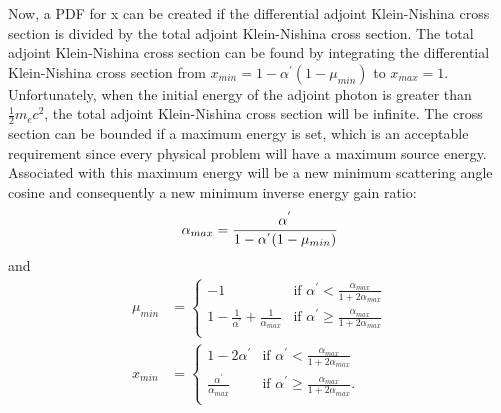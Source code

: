 Now, a PDF for x can be created if the differential adjoint Klein-Nishina cross
section is divided by the total adjoint Klein-Nishina cross section. The total
adjoint Klein-Nishina cross section can be found by integrating the differential
Klein-Nishina cross section from $x_{min} = 1-\alpha^{'}(1-\mu_{min})$ to 
$x_{max} = 1$. Unfortunately, when the initial energy of the adjoint photon is
greater than $\frac{1}{2}m_ec^2$, the total adjoint Klein-Nishina cross section
will be infinite. The cross section can be bounded if a maximum energy is set, 
which is an acceptable requirement since every physical problem will have a 
maximum source energy. Associated with this maximum energy will be a new 
minimum scattering angle cosine and consequently a new minimum inverse energy 
gain ratio:
\begin{equation*}
  \alpha_{max} = \frac{\alpha^{'}}{1-\alpha^{'}(1-\mu_{min})} \nonumber \\
\end{equation*}
and
\begin{align}
  \mu_{min} & = 
  \begin{cases}
    -1 & \text{if } \alpha^{'} < \frac{\alpha_{max}}{1+2\alpha_{max}} \\
    1 - \frac{1}{\alpha^{'}} + \frac{1}{\alpha_{max}} 
    & \text{if } \alpha^{'} \geq \frac{\alpha_{max}}{1+2\alpha_{max}} \\ 
  \end{cases} \\
  x_{min} & = 
  \begin{cases}
    1-2\alpha^{'} & \text{if } \alpha^{'} < \frac{\alpha_{max}}{1+2\alpha_{max}} \\
    \frac{\alpha^{'}}{\alpha_{max}} & \text{if } \alpha^{'} \geq
    \frac{\alpha_{max}}{1+2\alpha_{max}}. \\
  \end{cases}
\end{align}

